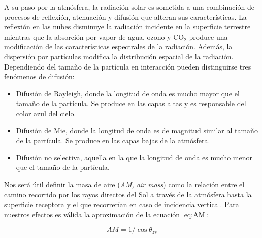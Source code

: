 A su paso por la atmósfera, la radiación solar es sometida a una
combinación de procesos de reflexión, atenuación y difusión que
alteran sus características.  La reflexión en las nubes disminuye la
radiación incidente en la superficie terrestre mientras que la
absorción por vapor de agua, ozono y $\mathrm{CO}_2$ produce una
modificación de las características espectrales de la
radiación. Además, la dispersión por partículas modifica la
distribución espacial de la radiación. Dependiendo del tamaño de la
partícula en interacción pueden distinguirse tres fenómenos de
difusión:
\begin{itemize}
\item Difusión de Rayleigh, donde la longitud de onda es mucho mayor
  que el tamaño de la partícula. Se produce en las capas altas y es responsable
del color azul del cielo.
\item Difusión de Mie, donde la longitud de onda es de magnitud similar al tamaño
de la partícula. Se produce en las capas bajas de la atmósfera.
\item Difusión no selectiva, aquella en la que la longitud de onda es mucho
menor que el tamaño de la partícula.
\end{itemize}
Nos será útil definir la masa de aire (\emph{AM, air mass}) como la
relación entre el camino recorrido por los rayos directos del Sol
a través de la atmósfera hasta la superficie receptora y el que recorrerían
en caso de incidencia vertical. Para nuestros efectos es válida la
aproximación de la ecuación \ref{eq:AM}:

\begin{equation}
AM=1/\cos\theta_{zs}\label{eq:AM}\end{equation}

